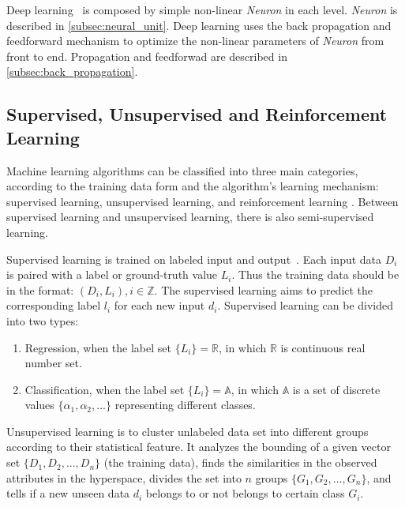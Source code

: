 \begin{spacing}{1.5}
Deep learning~\cite{lecun2015deep} is composed by simple non-linear \textit{Neuron} in each level. \textit{Neuron} is described in \autoref{subsec:neural_unit}. Deep learning uses the back propagation and feedforward mechanism to optimize the non-linear parameters of \textit{Neuron} from front to end. Propagation and feedforwad are described in \autoref{subsec:back_propagation}.


\subsection{Supervised, Unsupervised and Reinforcement Learning}

Machine learning algorithms can be classified into three main categories, according to the training data form and the algorithm's learning mechanism: supervised learning, unsupervised learning, and reinforcement learning \cite{mohri2018foundations}. Between supervised learning and unsupervised learning, there is also semi-supervised learning.

Supervised learning is trained on labeled input and output~\cite{sen2020supervised, kotsiantis2007supervised}. Each input data $D_i$ is paired with a label or ground-truth value $L_i$. Thus the training data should be in the format: $(D_i, L_i), i \in \mathbb{Z}$. The supervised learning aims to predict the corresponding label $l_i$ for each new input $d_i$. Supervised learning can be divided into two types: 

\begin{enumerate}
    \item Regression, when the label set $\{L_i\} = \mathbb{R}$, in which $\mathbb{R}$ is continuous real number set.
    \item Classification, when the label set $\{L_i\} = \mathbb{A}$, in which $\mathbb{A}$ is a set of discrete values $\{\alpha_1, \alpha_2, ...\}$ representing different classes.
\end{enumerate}

 Unsupervised learning is to cluster unlabeled data set into different groups according to their statistical feature\cite{meena2019survey}. It analyzes the bounding of a given vector set $\{D_1, D_2, ...,D_n\}$ (the training data), finds the similarities in the observed attributes in the hyperspace, divides the set into $n$ groups $\{G_1, G_2, ..., G_n\}$, and tells if a new unseen data $d_i$ belongs to or not belongs to certain class $G_i$.


\end{spacing}
